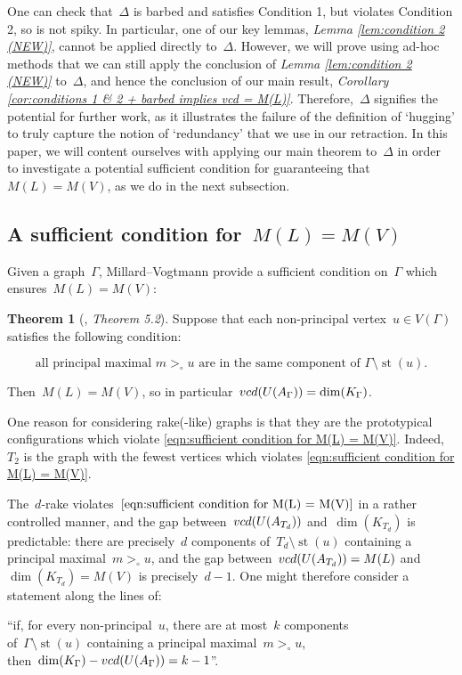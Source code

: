 \documentclass[11pt]{amsart}
\theoremstyle{definition}
\theoremstyle{definition}
\theoremstyle{definition}
\theoremstyle{definition}
\newtheorem{theorem}{Theorem}[section]
\newcommand{\vcduag}{\textsc{vcd}(U(A_{\Gamma}))} %
\newcommand{\str}[1]{\operatorname{st}({#1})} %
\newcommand{\spine}{K_{\Gamma}} %
\begin{document}
One can check that~$\Delta$ is barbed and satisfies Condition 1, but violates Condition 2, so is not spiky. In particular, one of our key lemmas, \emph{Lemma \ref{lem:condition 2 (NEW)}}, cannot be applied directly to~$\Delta$. However, we will prove using ad-hoc methods that we can still apply the conclusion of \emph{Lemma \ref{lem:condition 2 (NEW)}} to~$\Delta$, and hence the conclusion of our main result, \emph{Corollary \ref{cor:conditions 1 & 2 + barbed implies vcd = M(L)}}. Therefore,~$\Delta$ signifies the potential for further work, as it illustrates the failure of the definition of `hugging' to truly capture the notion of `redundancy' that we use in our retraction. In this paper, we will content ourselves with applying our main theorem to~$\Delta$ in order to investigate a potential sufficient condition for guaranteeing that~$M(L) = M(V)$, as we do in the next subsection.

\subsection{A sufficient condition for~$M(L) = M(V)$}\label{subsec:a suff cond for M(L) = M(V)}

Given a graph~$\Gamma$, Millard--Vogtmann provide a sufficient condition on~$\Gamma$ which ensures~$M(L) = M(V)$:
\begin{theorem}[\cite{MillardVogtmannCubeComplexes21}, \textit{Theorem 5.2}]\label{thm:sufficient condition for M(L) = M(V)}
    Suppose that each non-principal vertex~$u \in V(\Gamma)$ satisfies the following condition:

    \begin{equation}\label{eqn:sufficient condition for M(L) = M(V)}
        \text{all principal maximal~$m >_\circ u$ are in the same component of~$\Gamma \setminus \str{u}$}.
        \tag{$\dagger$}
    \end{equation}

    Then~$M(L) = M(V)$, so in particular~$\vcduag = \dim(\spine)$.
\end{theorem}

One reason for considering rake(-like) graphs is that they are the prototypical configurations which violate \eqref{eqn:sufficient condition for M(L) = M(V)}. Indeed,~$T_2$ is the graph with the fewest vertices which violates \eqref{eqn:sufficient condition for M(L) = M(V)}. 

The~$d$-rake violates~$\eqref{eqn:sufficient condition for M(L) = M(V)}$ in a rather controlled manner, and the gap between~$\textsc{vcd}(U(A_{T_d}))$ and~$\dim(K_{T_d})$ is predictable: there are precisely~$d$ components of~$T_d \setminus \str{u}$ containing a principal maximal~$m >_\circ u$, and the gap between~$\textsc{vcd}(U(A_{T_d})) = M(L)$ and~$\dim(K_{T_d}) = M(V)$ is precisely~$d-1$. One might therefore consider a statement along the lines of:
\begin{center}
    ``if, for every non-principal~$u$, there are at most~$k$ components \\ of~$\Gamma \setminus \str{u}$ containing a principal maximal~$m >_\circ u$, \\ then~$\dim(\spine) - \vcduag = k-1$''.
\end{center}
\end{document}
